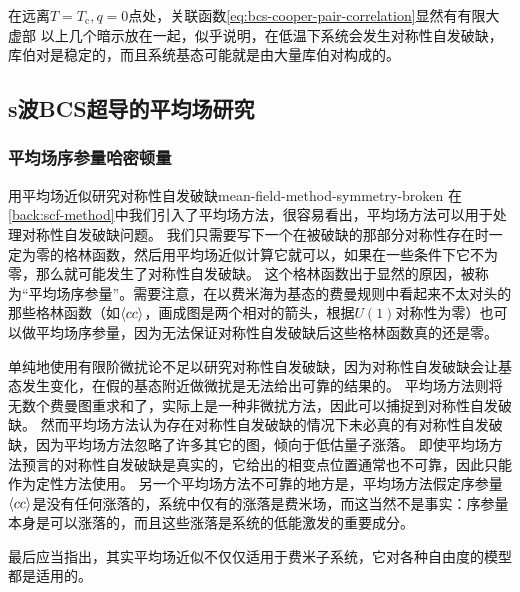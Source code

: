 在远离$T = T_\text{c}, q = 0$点处，关联函数\eqref{eq:bcs-cooper-pair-correlation}显然有有限大虚部
以上几个暗示放在一起，似乎说明，在低温下系统会发生对称性自发破缺，库伯对是稳定的，而且系统基态可能就是由大量库伯对构成的。

\subsection{s波BCS超导的平均场研究}

\subsubsection{平均场序参量哈密顿量}

\begin{back}{用平均场近似研究对称性自发破缺}{mean-field-method-symmetry-broken}
    在\autoref{back:scf-method}中我们引入了平均场方法，很容易看出，平均场方法可以用于处理对称性自发破缺问题。
    我们只需要写下一个在被破缺的那部分对称性存在时一定为零的格林函数，然后用平均场近似计算它就可以，如果在一些条件下它不为零，那么就可能发生了对称性自发破缺。
    这个格林函数出于显然的原因，被称为“平均场序参量”。需要注意，在以费米海为基态的费曼规则中看起来不太对头的那些格林函数（如$\expval{c c}$，画成图是两个相对的箭头，根据$U(1)$对称性为零）也可以做平均场序参量，因为无法保证对称性自发破缺后这些格林函数真的还是零。

    单纯地使用有限阶微扰论不足以研究对称性自发破缺，因为对称性自发破缺会让基态发生变化，在假的基态附近做微扰是无法给出可靠的结果的。
    平均场方法则将无数个费曼图重求和了，实际上是一种非微扰方法，因此可以捕捉到对称性自发破缺。
    然而平均场方法认为存在对称性自发破缺的情况下未必真的有对称性自发破缺，因为平均场方法忽略了许多其它的图，倾向于低估量子涨落。
    即使平均场方法预言的对称性自发破缺是真实的，它给出的相变点位置通常也不可靠，因此只能作为定性方法使用。
    另一个平均场方法不可靠的地方是，平均场方法假定序参量$\expval{cc}$是没有任何涨落的，系统中仅有的涨落是费米场，而这当然不是事实：序参量本身是可以涨落的，而且这些涨落是系统的低能激发的重要成分。

    最后应当指出，其实平均场近似不仅仅适用于费米子系统，它对各种自由度的模型都是适用的。
\end{back}

